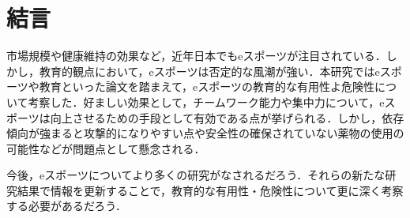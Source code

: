 \section{結言}

市場規模や健康維持の効果など，近年日本でもeスポーツが注目されている．しかし，教育的観点において，eスポーツは否定的な風潮が強い．本研究ではeスポーツや教育といった論文を踏まえて，eスポーツの教育的な有用性よ危険性について考察した．好ましい効果として，チームワーク能力や集中力について，eスポーツは向上させるための手段として有効である点が挙げられる．しかし，依存傾向が強まると攻撃的になりやすい点や安全性の確保されていない薬物の使用の可能性などが問題点として懸念される．

今後，eスポーツについてより多くの研究がなされるだろう．それらの新たな研究結果で情報を更新することで，教育的な有用性・危険性について更に深く考察する必要があるだろう．

